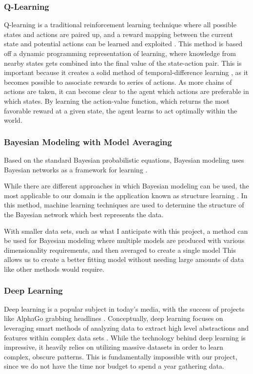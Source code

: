 \documentclass[draftclsnofoot,onecolumn,letterpaper,10pt]{IEEEtran}
\begin{document}
\subsubsection{Q-Learning}
Q-learning is a traditional reinforcement learning technique where all possible states and actions are paired up, and a reward mapping between the current state and potential actions can be learned and exploited \cite{SuttonBarto}.
This method is based off a dynamic programming representation of learning, where knowledge from nearby states gets combined into the final value of the state-action pair.
This is important because it creates a solid method of temporal-difference learning \cite{SuttonBarto}, as it becomes possible to associate rewards to series of actions.
As more chains of actions are taken, it can become clear to the agent which actions are preferable in which states.
By learning the action-value function, which returns the most favorable reward at a given state, the agent learns to act optimally within the world.
\subsubsection{Bayesian Modeling with Model Averaging}
Based on the standard Bayesian probabilistic equations, Bayesian modeling uses Bayesian networks as a framework for learning \cite{RussellNorvig}.

While there are different approaches in which Bayesian modeling can be used, the most applicable to our domain is the application known as structure learning \cite{RussellNorvig}.
In this method, machine learning techniques are used to determine the structure of the Bayesian network which best represents the data.

With smaller data sets, such as what I anticipate with this project, a method can be used for Bayesian modeling where multiple models are produced with various dimensionality requirements, and then averaged to create a single model \cite{RussellNorvig}
This allows us to create a better fitting model without needing large amounts of data like other methods would require.

\subsubsection{Deep Learning}
Deep learning is a popular subject in today's media, with the success of projects like AlphaGo grabbing headlines \cite{alphago}.
Conceptually, deep learning focuses on leveraging smart methods of analyzing data to extract high level abstractions and features within complex data sets \cite{Goodfellow-et-al-2016-Book}.
While the technology behind deep learning is impressive, it heavily relies on utilizing massive datasets in order to learn complex, obscure patterns.
This is fundamentally impossible with our project, since we do not have the time nor budget to spend a year gathering data.
\end{document}

